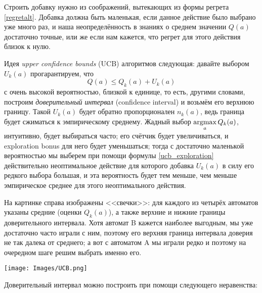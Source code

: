 Строить добавку нужно из соображений, вытекающих из формы регрета \eqref{regretalt}. Добавка должна быть маленькая, если данное действие было выбрано уже много раз, и наша неопределённость в знаниях о среднем значении $Q(a)$ достаточно точные, или же если нам кажется, что регрет для этого действия близок к нулю.

Идея \emph{upper confidence bounds} (UCB) алгоритмов следующая: давайте выбором $U_k(a)$ прогарантируем, что
$$Q(a) \le Q_k(a) + U_k(a)$$
с очень высокой вероятностью, близкой к единице, то есть, другими словами, построим \emph{доверительный интервал} (confidence interval) и возьмём его верхнюю границу. Такой $U_k(a)$ будет обратно пропорционален $n_k(a)$, ведь граница будет сжиматься к эмпирическому среднему. Жадный выбор $\mathop{\mathrm{argmax}}\limits_a Q_k(a)$, интуитивно, будет выбираться часто; его счётчик будет увеличиваться, и exploration bonus для него будет уменьшаться; тогда с достаточно маленькой вероятностью мы выберем при помощи формулы \eqref{ucb_exploration} действительно неоптимальное действие для которого добавка $U_k(a)$ в силу его редкого выбора большая, и эта вероятность будет тем меньше, чем меньше эмпирическое среднее для этого неоптимального действия.

\begin{exampleBox}[righthand ratio=0.4, sidebyside, sidebyside align=center, lower separated=false]{}
На картинке справа изображены <<свечки>>: для каждого из четырёх автоматов указаны средние (оценки $Q_k(a)$), а также верхние и нижние границы доверительного интервала. Хотя автомат B кажется наиболее выгодным, мы уже достаточно часто играли с ним, поэтому его верхняя граница интервала доверия не так далека от среднего; а вот с автоматом A мы играли редко и поэтому на очередном шаге решим выбрать именно его.

\tcblower
\texttt{[image: Images/UCB.png]}
\end{exampleBox}

Доверительный интервал можно построить при помощи следующего неравенства:

